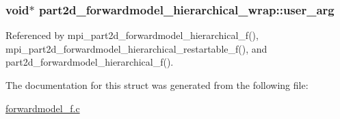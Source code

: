 \subsubsection[{\texorpdfstring{user\+\_\+arg}{user_arg}}]{\setlength{\rightskip}{0pt plus 5cm}void$\ast$ part2d\+\_\+forwardmodel\+\_\+hierarchical\+\_\+wrap\+::user\+\_\+arg}\hypertarget{structpart2d__forwardmodel__hierarchical__wrap_ab765763b700646ef1af8c7f9f680b597}{}\label{structpart2d__forwardmodel__hierarchical__wrap_ab765763b700646ef1af8c7f9f680b597}


Referenced by mpi\+\_\+part2d\+\_\+forwardmodel\+\_\+hierarchical\+\_\+f(), mpi\+\_\+part2d\+\_\+forwardmodel\+\_\+hierarchical\+\_\+restartable\+\_\+f(), and part2d\+\_\+forwardmodel\+\_\+hierarchical\+\_\+f().



The documentation for this struct was generated from the following file\+:\begin{DoxyCompactItemize}
\item 
\hyperlink{forwardmodel__f_8c}{forwardmodel\+\_\+f.\+c}\end{DoxyCompactItemize}
